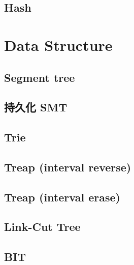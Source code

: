 \documentclass[a4paper,10pt,twocolumn,oneside]{article}
\begin{document}
\subsection{Hash}
 


\section{Data Structure}

\subsection{Segment tree}


\subsection{持久化 SMT}


\subsection{Trie}


\subsection{Treap  (interval reverse)}


\subsection{Treap  (interval erase)}


\subsection{Link-Cut Tree}


\subsection{BIT}


% 
\end{document}
